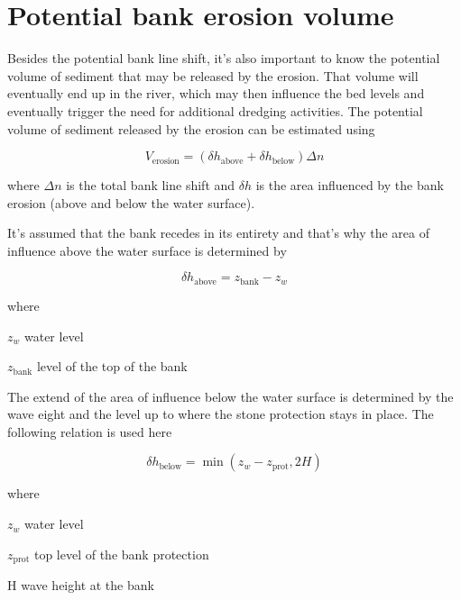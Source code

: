 \section{Potential bank erosion volume} \label{Sec4.4}

Besides the potential bank line shift, it's also important to know the potential volume of sediment that may be released by the erosion.
That volume will eventually end up in the river, which may then influence the bed levels and eventually trigger the need for additional dredging activities.
The potential volume of sediment released by the erosion can be estimated using

\begin{equation}
V_\text{erosion} = ( \delta h_\text{above} + \delta h_\text{below} ) \Delta n
\end{equation}

where $\Delta n$ is the total bank line shift and $\delta h$ is the area influenced by the bank erosion (above and below the water surface).

It's assumed that the bank recedes in its entirety and that's why the area of influence above the water surface is determined by

\begin{equation}
\delta h_\text{above} = z_\text{bank} - z_w
\end{equation}

where

\begin{symbollist}
\item[$z_w$] water level 
\item[$z_\text{bank}$] level of the top of the bank 
\end{symbollist}

The extend of the area of influence below the water surface is determined by the wave eight and the level up to where the stone protection stays in place.
The following relation is used here

\begin{equation}
\delta h_\text{below} = \min ( z_w - z_\text{prot}, 2 H )
\end{equation}

where

\begin{symbollist}
\item{$z_w$} water level 
\item{$z_\text{prot}$} top level of the bank protection 
\item{H} wave height at the bank 
\end{symbollist}

